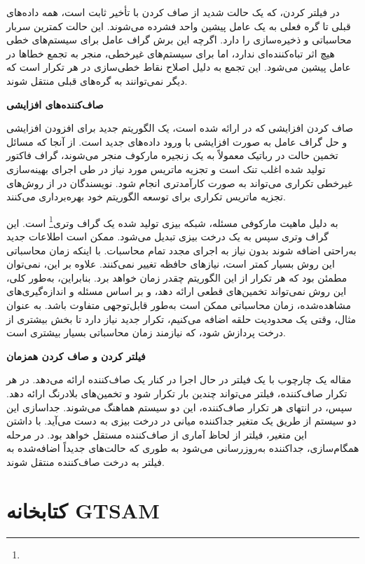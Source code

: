 در فیلتر کردن، که یک حالت شدید از صاف کردن با تأخیر ثابت است، همه داده‌های قبلی تا گره فعلی به یک عامل پیشین واحد فشرده می‌شوند. این حالت کمترین سربار محاسباتی و ذخیره‌سازی را دارد. اگرچه این برش گراف عامل برای سیستم‌های خطی هیچ اثر تباه‌کننده‌ای ندارد، اما برای سیستم‌های غیرخطی، منجر به تجمع خطاها در عامل پیشین می‌شود. این تجمع به دلیل اصلاح نقاط خطی‌سازی در هر تکرار است که دیگر نمی‌توانند به گره‌های قبلی منتقل شوند.

\textbf{صاف‌کننده‌های افزایشی}

صاف کردن افزایشی که در
\cite{kaess2012concurrent}
ارائه شده است، یک الگوریتم جدید برای افزودن افزایشی و حل گراف عامل به صورت افزایشی با ورود داده‌های جدید است. از آنجا که مسائل تخمین حالت در رباتیک معمولاً به یک زنجیره مارکوف منجر می‌شوند، گراف فاکتور تولید شده اغلب تنک است و تجزیه ماتریس مورد نیاز در طی اجرای بهینه‌سازی غیرخطی تکراری می‌تواند به صورت کارآمدتری انجام شود. نویسندگان در
\cite{kaess2012concurrent}
از روش‌های تجزیه ماتریس تکراری برای توسعه الگوریتم خود بهره‌برداری می‌کنند.

به دلیل ماهیت مارکوفی مسئله، شبکه بیزی تولید شده یک گراف وتری\footnote{}
 است. این گراف وتری سپس به یک درخت بیزی تبدیل می‌شود. ممکن است اطلاعات جدید به‌راحتی اضافه شوند بدون نیاز به اجرای مجدد تمام محاسبات. با اینکه زمان محاسباتی این روش بسیار کمتر است، نیازهای حافظه تغییر نمی‌کنند. علاوه بر این، نمی‌توان مطمئن بود که هر تکرار از این الگوریتم چقدر زمان خواهد برد. بنابراین، به‌طور کلی، این روش نمی‌تواند تخمین‌های قطعی ارائه دهد، و بر اساس مسئله و اندازه‌گیری‌های مشاهده‌شده، زمان محاسباتی ممکن است به‌طور قابل‌توجهی متفاوت باشد. به عنوان مثال، وقتی یک محدودیت حلقه اضافه می‌کنیم، تکرار جدید نیاز دارد تا بخش بیشتری از درخت پردازش شود، که نیازمند زمان محاسباتی بسیار بیشتری است.

\textbf{فیلتر کردن و صاف کردن همزمان}

مقاله
\cite{kaess2012concurrent}
یک چارچوب با یک فیلتر در حال اجرا در کنار یک صاف‌کننده ارائه می‌دهد. در هر تکرار صاف‌کننده، فیلتر می‌تواند چندین بار تکرار شود و تخمین‌های بلادرنگ ارائه دهد. سپس، در انتهای هر تکرار صاف‌کننده، این دو سیستم هماهنگ می‌شوند. جداسازی این دو سیستم از طریق یک متغیر جداکننده میانی در درخت بیزی به دست می‌آید. با داشتن این متغیر، فیلتر از لحاظ آماری از صاف‌کننده مستقل خواهد بود. در مرحله همگام‌سازی، جداکننده به‌روزرسانی می‌شود به طوری که حالت‌های جدیداً اضافه‌شده به فیلتر به درخت صاف‌کننده منتقل شوند.

\section{کتابخانه GTSAM}

